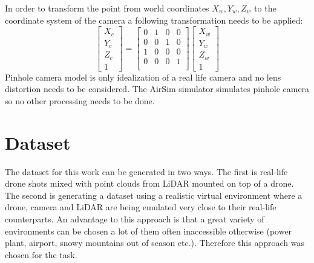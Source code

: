 \documentclass[twoside]{ctuthesis}
\theoremstyle{plain}
\theoremstyle{definition}
\theoremstyle{note}
\begin{document}
In order to transform the point from world coordinates $X_w,Y_w,Z_w$ to the coordinate system of the camera a following transformation needs to be applied:
\begin{equation} \label{eq:3}
	\begin{bmatrix}
		X_c\\
		Y_c\\
		Z_c\\
		1
	\end{bmatrix}=
	\begin{bmatrix}
		0 & 1 & 0 & 0\\
		0 & 0 & 1 & 0\\
		1 & 0 & 0 & 0\\
		0 & 0 & 0 & 1\\
	\end{bmatrix}
	\begin{bmatrix}
		X_w\\
		Y_w\\
		Z_w\\
		1
	\end{bmatrix}
\end{equation}
Pinhole camera model is only idealization of a real life camera and no lens distortion needs to be considered. The AirSim simulator simulates pinhole camera so no other processing needs to be done.
\section{Dataset}
The dataset for this work can be generated in two ways. The first is real-life drone shots mixed with point clouds from LiDAR mounted on top of a drone. The second is generating a dataset using a realistic virtual environment where a drone, camera and LiDAR are being emulated very close to their real-life counterparts. An advantage to this approach is that a great variety of environments can be chosen a lot of them often inaccessible otherwise (power plant, airport, snowy mountains out of season etc.). Therefore this approach was chosen for the task.
\end{document}
